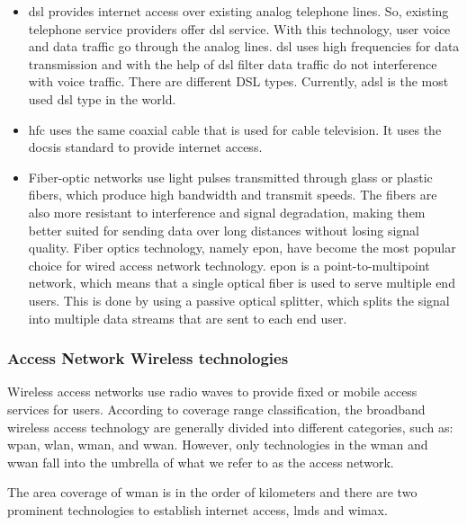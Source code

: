 \begin{itemize}

    \item \ac{dsl} provides internet access over existing analog telephone lines. So, existing telephone service providers offer \ac{dsl} service. With this technology, user voice and data traffic go through the analog lines. \ac{dsl} uses high frequencies for data transmission and with the help of \ac{dsl} filter data traffic do not interference with voice traffic.
    There are different DSL types. Currently, \ac{adsl} is the most used \ac{dsl} type in the world. 

    \item \ac{hfc} uses the same coaxial cable that is used for cable television. It uses the \ac{docsis} standard to provide internet access.

    \item Fiber-optic networks use light pulses transmitted through glass or plastic fibers, which produce high bandwidth and transmit speeds. 
    The fibers are also more resistant to interference and signal degradation, making them better suited for sending data over long distances without losing signal quality.
    Fiber optics technology, namely \ac{epon}, have become the most popular choice for wired access network technology. \ac{epon} is a point-to-multipoint network, which means that a single optical fiber is used to serve multiple end users. This is done by using a passive optical splitter, which splits the signal into multiple data streams that are sent to each end user.

\end{itemize}


\subsubsection{Access Network Wireless technologies}

Wireless access networks use radio waves to provide fixed or mobile access services for users. 
According to coverage range classification, the broadband wireless access technology are generally divided into different categories, such as: \ac{wpan}, \ac{wlan}, \ac{wman}, and \ac{wwan}. However, only technologies in the \ac{wman} and \ac{wwan} fall into the umbrella of what we refer to as the access network.

The area coverage of \ac{wman} is in the order of kilometers and there are two prominent technologies to establish internet access, \ac{lmds} and \ac{wimax}.

